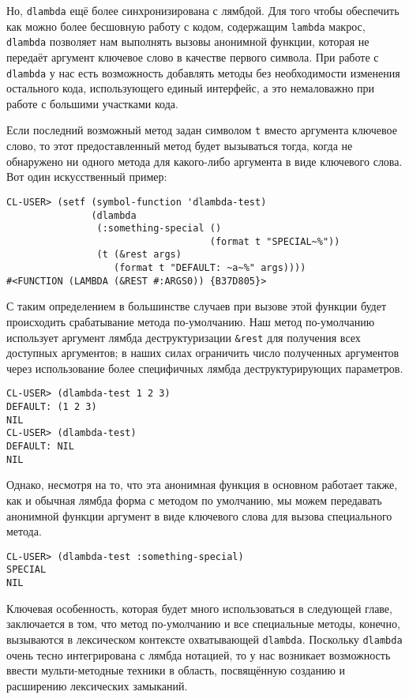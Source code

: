 Но, \verb"dlambda" ещё более синхронизирована с лямбдой. Для того чтобы обеспечить как можно более бесшовную работу с кодом, содержащим \verb"lambda" макрос, \verb"dlambda" позволяет нам выполнять вызовы анонимной функции, которая не передаёт аргумент ключевое слово в качестве первого символа. При работе с \verb"dlambda" у нас есть возможность добавлять методы без необходимости изменения остального кода, использующего единый интерфейс, а это немаловажно при работе с большими участками кода.

Если последний возможный метод задан символом \verb"t" вместо аргумента ключевое слово, то этот предоставленный метод будет вызываться тогда, когда не обнаружено ни одного метода для какого-либо аргумента в виде ключевого слова. Вот один искусственный пример:

\begin{verbatim}
CL-USER> (setf (symbol-function 'dlambda-test)
               (dlambda
                (:something-special ()
                                    (format t "SPECIAL~%"))
                (t (&rest args)
                   (format t "DEFAULT: ~a~%" args))))
#<FUNCTION (LAMBDA (&REST #:ARGS0)) {B37D805}>
\end{verbatim}

С таким определением в большинстве случаев при вызове этой функции будет происходить срабатывание метода по-умолчанию. Наш метод по-умолчанию использует аргумент лямбда деструктуризации \verb"&rest" для получения всех доступных аргументов; в наших силах ограничить число полученных аргументов через использование более специфичных лямбда деструктурирующих параметров.

\begin{verbatim}
CL-USER> (dlambda-test 1 2 3)
DEFAULT: (1 2 3)
NIL
CL-USER> (dlambda-test)
DEFAULT: NIL
NIL
\end{verbatim}

Однако, несмотря на то, что эта анонимная функция в основном работает также, как и обычная лямбда форма с методом по умолчанию, мы можем передавать анонимной функции аргумент в виде ключевого слова для вызова специального метода.

\begin{verbatim}
CL-USER> (dlambda-test :something-special)
SPECIAL
NIL
\end{verbatim}

Ключевая особенность, которая будет много использоваться в следующей главе, заключается в том, что метод по-умолчанию и все специальные методы, конечно, вызываются в лексическом контексте охватывающей \verb"dlambda". Поскольку \verb"dlambda" очень тесно интегрирована с лямбда нотацией, то у нас возникает возможность ввести мульти-методные техники в область, посвящённую созданию и расширению лексических замыканий.
